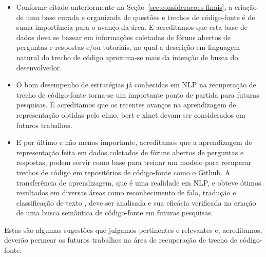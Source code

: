 \begin{itemize}
    \item Conforme citado anteriormente na Seção~\ref{sec:consideracoes-finais}, a criação de uma base curada e organizada de questões e trechos de código-fonte é de suma importância para o avanço da área. E acreditamos que esta base de dados deva se basear em informações coletadas de fóruns abertos de perguntas e respostas e/ou tutoriais, no qual a descrição em linguagem natural do trecho de código aproxima-se mais da intenção de busca do desenvolvedor.
    \item O bom desempenho de estratégias já conhecidas em NLP na recuperação de trecho de código-fonte torna-se um importante ponto de partida para futuras pesquisas. E acreditamos que os recentes avanços na aprendizagem de representação obtidas pelo \acrshort{elmo}, \acrshort{bert} e \Gls{xlnet} devam ser considerados em futuros trabalhos. 
    \item E por último e não menos importante, acreditamos que a aprendizagem de representação feita em dados coletados de fóruns abertos de perguntas e respostas, podem servir como base para treinar um modelo para recuperar trechos de código em repositórios de código-fonte como o Github. A transferência de aprendizagem, que é uma realidade em NLP, e obteve ótimos resultados em diversas áreas como reconhecimento de fala, tradução e classificação de texto \cite{devlin-etal-2019-bert}, deve ser analisada e sua eficácia verificada na criação de uma busca semântica de código-fonte em futuras pesquisas.
\end{itemize}

Estas são algumas sugestões que julgamos pertinentes e relevantes e, acreditamos, deverão permear os futuros trabalhos na área de recuperação de trecho de código-fonte. 
